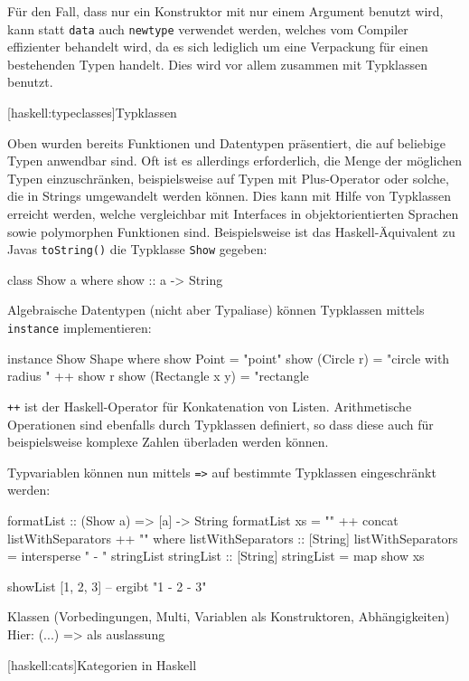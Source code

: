 \documentclass[11pt, a4paper, bibgerm]{book}
\newcommand\icode[1]{\lstinline?#1?}
\newcommand\lsection{}
\begin{document}
Für den Fall, dass nur ein Konstruktor mit nur einem Argument benutzt
wird, kann statt \icode{data} auch \icode{newtype} verwendet
werden, welches vom Compiler effizienter behandelt wird, da es sich
lediglich um eine Verpackung für einen bestehenden Typen handelt. Dies
wird vor allem zusammen mit Typklassen benutzt.

\lsection[haskell:typeclasses]{Typklassen}

Oben wurden bereits Funktionen und Datentypen präsentiert, die auf
beliebige Typen anwendbar sind. Oft ist es allerdings erforderlich, die
Menge der möglichen Typen einzuschränken, beispielsweise auf Typen mit
Plus-Operator oder solche, die in Strings umgewandelt werden
können. Dies kann mit Hilfe von Typklassen erreicht werden, welche
vergleichbar mit Interfaces in objektorientierten Sprachen sowie
polymorphen Funktionen sind. Beispielsweise ist das Haskell-Äquivalent
zu Javas \icode{toString()} die Typklasse \icode{Show} gegeben:
\begin{code}
class Show a where
  show :: a -> String
\end{code}
Algebraische Datentypen (nicht aber Typaliase) können Typklassen mittels
\icode{instance} implementieren:
\begin{code}
instance Show Shape where
  show Point           = "point"
  show (Circle r)      = "circle with radius " ++ show r
  show (Rectangle x y) = "rectangle
\end{code}
\icode{++} ist der Haskell-Operator für Konkatenation von Listen.
Arithmetische Operationen sind ebenfalls durch Typklassen definiert, so
dass diese auch für beispielsweise komplexe Zahlen überladen werden
können.

Typvariablen können nun mittels \icode{=>} auf bestimmte Typklassen
eingeschränkt werden:
\begin{code}
formatList :: (Show a) => [a] -> String
formatList xs = "{" ++ concat listWithSeparators ++ "}"
  where listWithSeparators :: [String]
        listWithSeparators = intersperse " - " stringList
        stringList :: [String]
        stringList = map show xs

showList [1, 2, 3] -- ergibt "{1 - 2 - 3}"
\end{code}

 Klassen (Vorbedingungen, Multi, Variablen als Konstruktoren, Abhängigkeiten)
 Hier: (...) => als auslassung

\lsection[haskell:cats]{Kategorien in Haskell}
\end{document}
